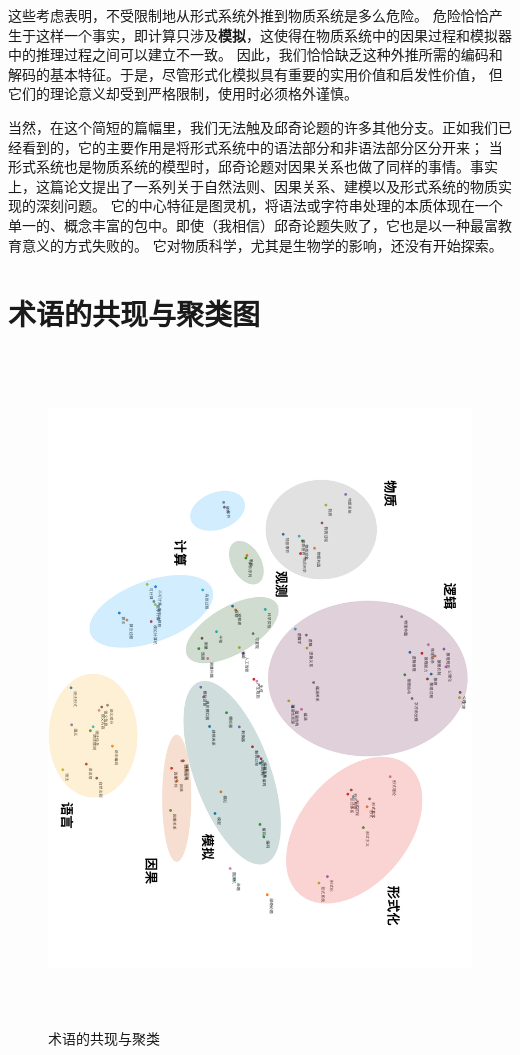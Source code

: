 \documentclass[a4paper,12pt]{article}
\begin{document}
这些考虑表明，不受限制地从形式系统外推到物质系统是多么危险。
危险恰恰产生于这样一个事实，即计算只涉及\textbf{模拟}，这使得在物质系统中的因果过程和模拟器中的推理过程之间可以建立不一致。
因此，我们恰恰缺乏这种外推所需的编码和解码的基本特征。于是，尽管形式化模拟具有重要的实用价值和启发性价值，
但它们的理论意义却受到严格限制，使用时必须格外谨慎。

当然，在这个简短的篇幅里，我们无法触及邱奇论题的许多其他分支。正如我们已经看到的，它的主要作用是将形式系统中的语法部分和非语法部分区分开来；
当形式系统也是物质系统的模型时，邱奇论题对因果关系也做了同样的事情。事实上，这篇论文提出了一系列关于自然法则、因果关系、建模以及形式系统的物质实现的深刻问题。
它的中心特征是图灵机，将语法或字符串处理的本质体现在一个单一的、概念丰富的包中。即使（我相信）邱奇论题失败了，它也是以一种最富教育意义的方式失败的。
它对物质科学，尤其是生物学的影响，还没有开始探索。

\newpage
{}
{}



\newpage
{}
{}
\printindex
\printglossaries

\newpage
\appendix
\setcounter{page}{20}
\section{术语的共现与聚类图}

\begin{figure}[ht]
\centering
\includegraphics[height=7in]{images/concepts.png}
\caption{术语的共现与聚类}
\end{figure}
\end{document}
